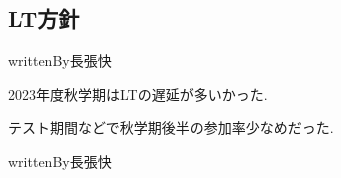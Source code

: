\subsection*{LT方針}

writtenBy{\kensuiChief}{長張}{快}


2023年度秋学期はLTの遅延が多いかった.

テスト期間などで秋学期後半の参加率少なめだった.

writtenBy{\kensuiStaff}{長張}{快}
